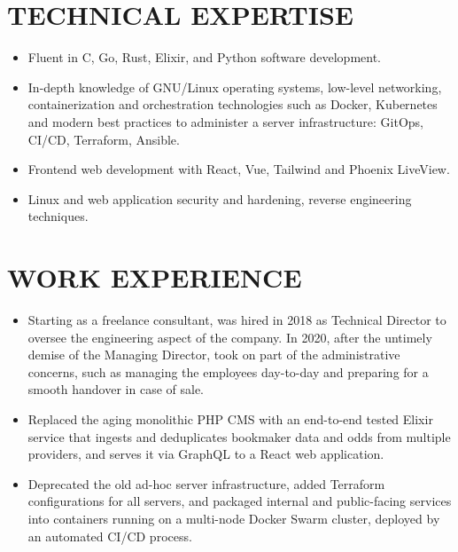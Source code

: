 \documentclass{resume}
\begin{document}

\section{TECHNICAL EXPERTISE}

\begin{itemize}
\item Fluent in C, Go, Rust, Elixir, and Python software development.
\item In-depth knowledge of GNU/Linux operating systems, low-level networking, containerization and orchestration technologies such as Docker, Kubernetes and modern best practices to administer a server infrastructure: GitOps, CI/CD, Terraform, Ansible.
\item Frontend web development with React, Vue, Tailwind and Phoenix LiveView.
\item Linux and web application security and hardening, reverse engineering techniques.
\end{itemize}

\section{WORK EXPERIENCE}


\begin{itemize}
\item Starting as a freelance consultant, was hired in 2018 as Technical Director to oversee the engineering aspect of the company. In 2020, after the untimely demise of the Managing Director, took on part of the administrative concerns, such as managing the employees day-to-day and preparing for a smooth handover in case of sale.
\item Replaced the aging monolithic PHP CMS with an end-to-end tested Elixir service that ingests and deduplicates bookmaker data and odds from multiple providers, and serves it via GraphQL to a React web application.
\item Deprecated the old ad-hoc server infrastructure, added Terraform configurations for all servers, and packaged internal and public-facing services into containers running on a multi-node Docker Swarm cluster, deployed by an automated CI/CD process.
\end{itemize}
\end{document}
